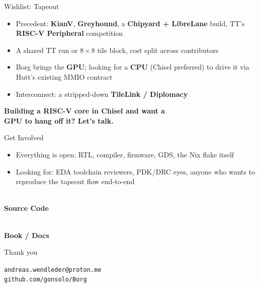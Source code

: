 \documentclass[aspectratio=169]{beamer}
\begin{document}
\begin{frame}{Wishlist: Tapeout}
  \begin{itemize}[leftmargin=*]
    \item Precedent: \textbf{KianV}, \textbf{Greyhound}, a
          \textbf{Chipyard + LibreLane} build, TT's \textbf{RISC-V
          Peripheral} competition
    \item A shared TT run or $8\times8$ tile block, cost split across
          contributors
    \item Borg brings the \textbf{GPU}; looking for a \textbf{CPU} (Chisel
          preferred) to drive it via Hutt's existing MMIO contract
    \item Interconnect: a stripped-down \textbf{TileLink / Diplomacy}
  \end{itemize}
  \vfill
  \centering
  \textcolor{borgorange}{\textbf{Building a RISC-V core in Chisel and want a}}\\
  \textcolor{borgorange}{\textbf{GPU to hang off it? Let's talk.}}
\end{frame}

\begin{frame}{Get Involved}
  \begin{itemize}[leftmargin=*]
    \item Everything is open: RTL, compiler, firmware, GDS, the Nix flake
          itself
    \item Looking for: EDA toolchain reviewers, PDK/DRC eyes, anyone who
          wants to reproduce the tapeout flow end-to-end
  \end{itemize}
  \vfill
  \begin{center}
    \begin{minipage}{0.45\linewidth}
      \centering
      \\[0.2em]
      {\small\textbf{Source Code}}
    \end{minipage}
    \hfill
    \begin{minipage}{0.45\linewidth}
      \centering
      \\[0.2em]
      {\small\textbf{Book / Docs}}
    \end{minipage}
  \end{center}
\end{frame}

\begin{frame}
  \centering
  {\LARGE Thank you}
  \vspace{1em}

  \texttt{andreas.wendleder@proton.me}\\
  \texttt{github.com/gonsolo/Borg}
\end{frame}
\end{document}
